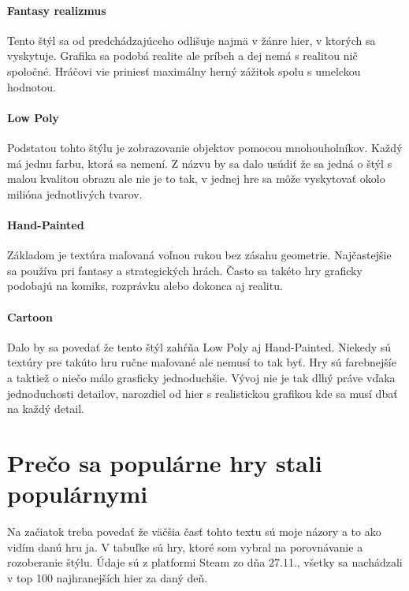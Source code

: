 \documentclass[10pt,twoside,slovak,a4paper]{article}
\begin{document}
\paragraph{Fantasy realizmus}
Tento štýl sa od predchádzajúceho odlišuje najmä v žánre hier, v ktorých sa vyskytuje. Grafika sa podobá realite ale príbeh a dej nemá s realitou nič spoločné. Hráčovi vie priniesť maximálny herný zážitok spolu s umelckou hodnotou.


\paragraph{Low Poly}
Podstatou tohto štýlu je zobrazovanie objektov pomocou mnohouholníkov. Každý má jednu farbu, ktorá sa nemení. Z názvu by sa dalo usúdiť že sa jedná o štýl s malou kvalitou obrazu ale nie je to tak, v jednej hre sa môže vyskytovať okolo milióna jednotlivých tvarov.


\paragraph{Hand-Painted}
Základom je textúra maľovaná voľnou rukou bez zásahu geometrie. Najčastejšie sa používa pri fantasy a strategických hrách. Často sa takéto hry graficky podobajú na komiks, rozprávku alebo dokonca aj realitu.

\paragraph{Cartoon}
Dalo by sa povedať že tento štýl zahŕňa Low Poly aj Hand-Painted. Niekedy sú textúry pre takúto hru ručne maľované ale nemusí to tak byť. Hry sú farebnejšíe a taktiež o niečo málo grasficky jednoduchšie. Vývoj nie je tak dlhý práve vďaka jednoduchosti detailov, narozdiel od hier s realistickou grafikou kde sa musí dbať na každý detail.



\section{Prečo sa populárne hry stali populárnymi}
Na začiatok treba povedať že väčšia časť tohto textu sú moje názory a to ako vidím danú hru ja. V tabuľke sú hry, ktoré som vybral na porovnávanie a rozoberanie štýlu. Údaje sú z platformi Steam zo dňa 27.11., všetky sa nachádzali v top 100 najhranejších hier za daný deň.
\end{document}
